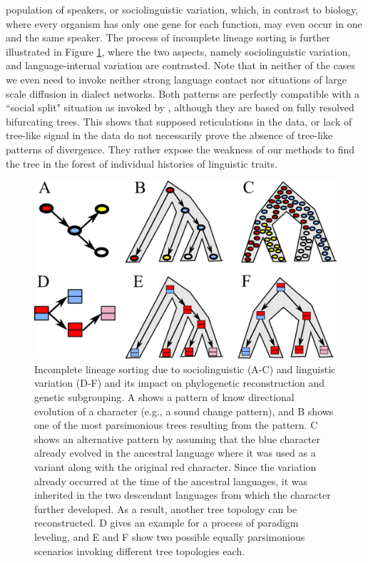 \documentclass[svgnames,12pt]{scrartcl}
\begin{document}
{{population of speakers, or sociolinguistic variation, which, in contrast to biology, where every
organism has only one gene for each function, may even occur in one and the same speaker. 
The process of incomplete lineage sorting is further illustrated in Figure \ref{fig:ils}, where the
two aspects, namely sociolinguistic variation, and language-internal variation are contrasted. Note
that in neither of the cases we even need to invoke neither strong language contact nor situations
of large scale diffusion in dialect networks. Both patterns are perfectly compatible with a ``social
split" situation as invoked by \citet{Francois2015}, although they are based on fully resolved
bifurcating trees. This shows that supposed reticulations in the data, or lack of tree-like signal
in the data do not necessarily prove the absence of tree-like patterns of divergence. They rather
expose the weakness of our methods to find the tree in the forest of individual histories of
linguistic traits.  

\begin{figure}[htb]
  \centering
  \includegraphics[width=\textwidth]{images/ils.pdf}
  \caption{Incomplete lineage sorting due to sociolinguistic (A-C) and linguistic variation (D-F) and its impact
  on phylogenetic reconstruction and genetic subgrouping. A shows a pattern of know directional
  evolution of a character (e.g., a sound change pattern), and B shows one of the most parsimonious
  trees resulting from the pattern. C shows an alternative pattern by assuming that the blue
  character already evolved in the ancestral language where it was used as a variant along with the
  original red character. Since the variation already occurred at the time of the ancestral
  languages, it was inherited in the two descendant languages from which the character further
  developed. As a result, another tree topology can be reconstructed. D gives an example for a
  process of paradigm leveling, and E and F show two possible equally parsimonious scenarios
  invoking different tree topologies each.}
  \label{fig:ils}
\end{figure}

}}
\end{document}
